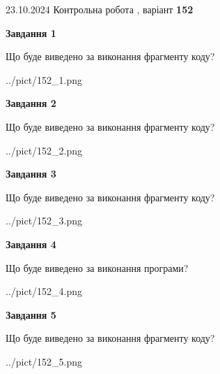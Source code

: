 \documentclass[12pt, ukrainian]{article}
\begin{document}
{\Large{23.10.2024 Контрольна робота , варіант  \No \textbf { 152 }\par}}
{
\begin {large}
{\begin {center}\textbf{Завдання 1}\end {center}}

Що буде виведено за виконання фрагменту коду?\par
\begin{center}
	{../pict/152_1.png}
\end{center}
\newpage

{\begin {center}\textbf{Завдання 2}\end {center}}

Що буде виведено за виконання фрагменту коду?\par
\begin{center}
	{../pict/152_2.png}
\end{center}
\newpage

{\begin {center}\textbf{Завдання 3}\end {center}}

Що буде виведено за виконання фрагменту коду?\par
\begin{center}
	{../pict/152_3.png}
\end{center}
\newpage

{\begin {center}\textbf{Завдання 4}\end {center}}

Що буде виведено за виконання програми?\par
\begin{center}
	{../pict/152_4.png}
\end{center}
\newpage

{\begin {center}\textbf{Завдання 5}\end {center}}

Що буде виведено за виконання фрагменту коду?\par
\begin{center}
	{../pict/152_5.png}
\end{center}
\newpage


\end{large}}
\end{document}
